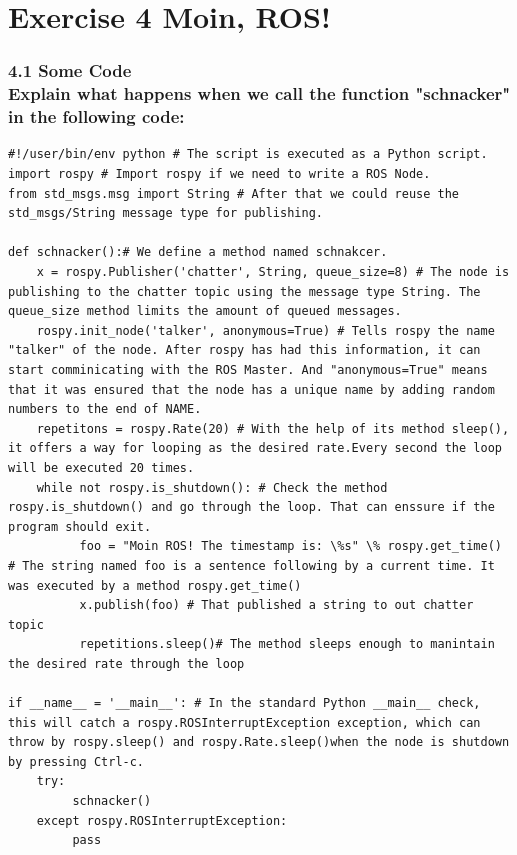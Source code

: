 \documentclass{ROS}
\begin{document}
\section*{Exercise 4 Moin, ROS!}
\subsubsection*{4.1 Some Code\\Explain what happens when we call the function "schnacker" in the following code:}
\begin{lstlisting}[firstnumber=1]
#!/user/bin/env python # The script is executed as a Python script.
import rospy # Import rospy if we need to write a ROS Node.
from std_msgs.msg import String # After that we could reuse the std_msgs/String message type for publishing.

def schnacker():# We define a method named schnakcer.
    x = rospy.Publisher('chatter', String, queue_size=8) # The node is publishing to the chatter topic using the message type String. The queue_size method limits the amount of queued messages.
    rospy.init_node('talker', anonymous=True) # Tells rospy the name "talker" of the node. After rospy has had this information, it can start comminicating with the ROS Master. And "anonymous=True" means that it was ensured that the node has a unique name by adding random numbers to the end of NAME.
    repetitons = rospy.Rate(20) # With the help of its method sleep(), it offers a way for looping as the desired rate.Every second the loop will be executed 20 times.
    while not rospy.is_shutdown(): # Check the method rospy.is_shutdown() and go through the loop. That can enssure if the program should exit.
          foo = "Moin ROS! The timestamp is: \%s" \% rospy.get_time() # The string named foo is a sentence following by a current time. It was executed by a method rospy.get_time()
          x.publish(foo) # That published a string to out chatter topic
          repetitions.sleep()# The method sleeps enough to manintain the desired rate through the loop

if __name__ = '__main__': # In the standard Python __main__ check, this will catch a rospy.ROSInterruptException exception, which can throw by rospy.sleep() and rospy.Rate.sleep()when the node is shutdown by pressing Ctrl-c.
    try:
         schnacker()
    except rospy.ROSInterruptException:
         pass
\end{lstlisting}
\end{document}
